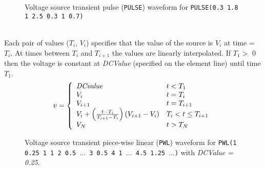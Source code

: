 \begin{figure}[hbp]
\centering

\caption[Voltage source transient pulse ({\tt PULSE}) waveform]{Voltage source
transient pulse ({\tt PULSE}) waveform for\newline \hspace*{\fill}
{\tt PULSE(0.3 1.8 1 2.5 0.3 1 0.7)} \hspace*{\fill} \label{fig:vpulse}}
\end{figure}

\\[0.2in]
Each pair of values ($T_i$, $V_i$) specifies that  the  value
of  the  source  is $V_i$ at time = $T_i$. At times between $T_i$ and
$T_{i+1}$ the values are linearly interpolated.
If $T_1 >$ 0 then the voltage is constant at {\it DCValue}
(specified on the element line) until time $T_1$.
\begin{equation}
v = \left\{ \begin{array}{ll}
    {\it DCvalue}& t < T_1\\
    V_i         & t = T_i\\
    V_{i+1}     & t = T_{i+1}\\
    V_i + \left({{t-T_i} \over {T_{i+1} - T_i}}\right)(V_{i+1}-V_i)
                & T_i < t \le T_{i+1}\\
    V_N         & t > T_N\\
     \end{array} \right. %
\end{equation}
\begin{figure}[hbp]
\centering

\caption[Voltage source transient piece-wise linear ({\tt PWL}) waveform]{Voltage
source transient piece-wise linear ({\tt PWL}) waveform for\newline \hspace*{\fill}
{\tt PWL(1 0.25  1 1 2 0.5 $\ldots$ 3 0.5 4 1 $\ldots$ 4.5 1.25 $\ldots$)} with
{\it DCValue = 0.25}.  \hspace*{\fill} }
\end{figure}


\\[0.2in]



